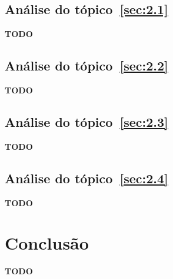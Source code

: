 \documentclass[12pt]{article}
\begin{document}
\subsection{Análise do tópico~\ref{sec:2.1}}\label{sec:analise2.1}

\textbf{TODO}

\subsection{Análise do tópico~\ref{sec:2.2}}\label{sec:analise2.2}

\textbf{TODO}

\subsection{Análise do tópico~\ref{sec:2.3}}\label{sec:analise2.3}

\textbf{TODO}

\subsection{Análise do tópico~\ref{sec:2.4}}\label{sec:analise2.4}

\textbf{TODO}

\section{Conclusão}\label{sec:Conclusao}

\textbf{TODO}


\end{document}
